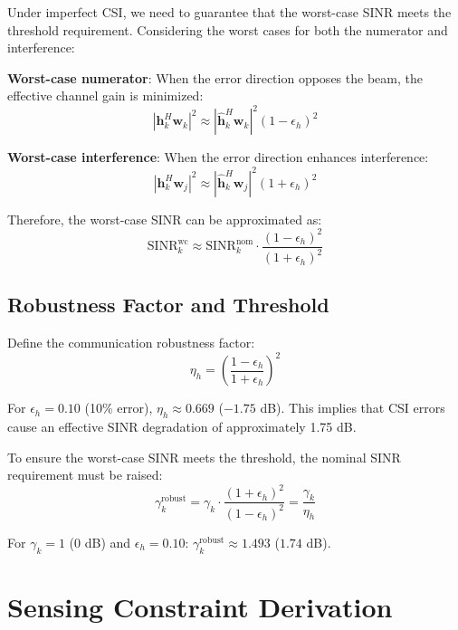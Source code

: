 \documentclass[12pt,a4paper]{article}
\newcommand{\vect}[1]{\mathbf{#1}}
\begin{document}
Under imperfect CSI, we need to guarantee that the worst-case SINR meets the threshold requirement. Considering the worst cases for both the numerator and interference:

\textbf{Worst-case numerator}: When the error direction opposes the beam, the effective channel gain is minimized:
\begin{equation}
|\vect{h}_k^H \vect{w}_k|^2 \approx |\hat{\vect{h}}_k^H \vect{w}_k|^2 (1 - \epsilon_h)^2
\end{equation}

\textbf{Worst-case interference}: When the error direction enhances interference:
\begin{equation}
|\vect{h}_k^H \vect{w}_j|^2 \approx |\hat{\vect{h}}_k^H \vect{w}_j|^2 (1 + \epsilon_h)^2
\end{equation}

Therefore, the worst-case SINR can be approximated as:
\begin{equation}
\text{SINR}_k^{\text{wc}} \approx \text{SINR}_k^{\text{nom}} \cdot \frac{(1-\epsilon_h)^2}{(1+\epsilon_h)^2} \tag{2}
\end{equation}

\subsection{Robustness Factor and Threshold}

Define the communication robustness factor:
\begin{equation}
\eta_h = \left(\frac{1-\epsilon_h}{1+\epsilon_h}\right)^2 \tag{3}
\end{equation}

For $\epsilon_h = 0.10$ (10\% error), $\eta_h \approx 0.669$ ($-1.75$ dB). This implies that CSI errors cause an effective SINR degradation of approximately 1.75 dB.

To ensure the worst-case SINR meets the threshold, the nominal SINR requirement must be raised:
\begin{equation}
\gamma_k^{\text{robust}} = \gamma_k \cdot \frac{(1+\epsilon_h)^2}{(1-\epsilon_h)^2} = \frac{\gamma_k}{\eta_h} \tag{4}
\end{equation}

For $\gamma_k = 1$ (0 dB) and $\epsilon_h = 0.10$: $\gamma_k^{\text{robust}} \approx 1.493$ ($1.74$ dB).

\section{Sensing Constraint Derivation}
\end{document}
